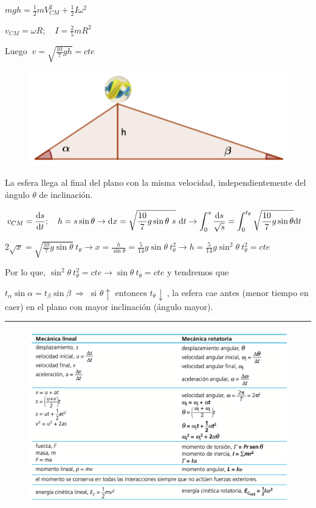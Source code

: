 \begin{multicols}{2}
$mgh=\frac 1 2 m V_{CM}^2+\frac 1 2 I \omega^2$

$v_{CM}=\omega R;\quad I=\frac 2 5 mR^2$

Luego $\ v=\sqrt{\frac {10}{7}gh}=cte$
\begin{figure}[H]
	\centering
	\includegraphics[width=.5\textwidth]{imagenes/imagenes16/T16IM24.png}
\end{figure}	
\end{multicols}
La esfera llega al final del plano con la misma velocidad, independientemente del ángulo $\theta$ de inclinación.

$v_{CM}=\displaystyle \dv{s}{t}; \quad h=s \sin \theta \to \dd x= \sqrt{\frac {10}{7}g \sin \theta \ s }\ \dd t \to \int_0^s \frac{\dd s}{\sqrt{s}}=\int_0^{t_\theta} \sqrt{\frac {10}{7}g\sin \theta}\dd t$

$\displaystyle 2\sqrt{x}= \sqrt{\frac {10}{7}g\sin \theta} \ t_\theta \to x=\frac {h}{\sin \theta}=\frac 5{14} g \sin \theta \ t^2_\theta \to h=\frac 5{14} g \sin^2 \theta \ t^2_\theta =cte$

Por lo que, $\sin^2 \theta \ t_\theta^2=cte \to \sin \theta \ t_{\theta}=cte$ y tendremos que

$t_\alpha \sin \alpha = t_\beta \sin \beta \ \Rightarrow \ \text{ si } \theta \uparrow \text{ entonces } t_\theta \downarrow\ $, la esfera cae antes (menor tiempo en caer) en el plano con mayor inclinación (ángulo mayor).


\rule{5cm}{0.3pt}
\vspace{1cm}
\begin{figure}[H]
	\centering
	\includegraphics[width=1\textwidth]{imagenes/imagenes16/T16IM25.png}
\end{figure}




